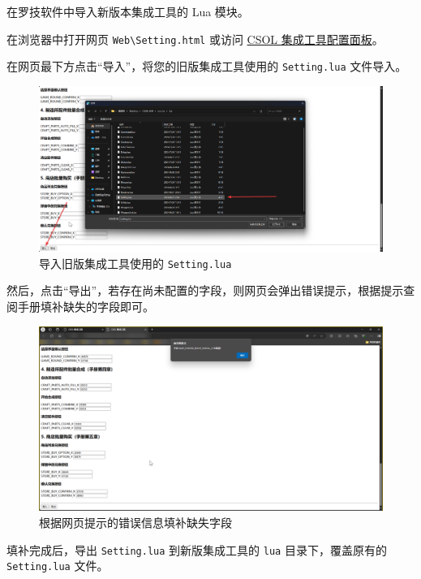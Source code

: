 在罗技软件中导入新版本集成工具的 Lua 模块。

在浏览器中打开网页 \lstinline{Web\Setting.html} 或访问 \href{https://macrohard.fun/CSOL-Utilities/Setting.html}{CSOL 集成工具配置面板}。

在网页最下方点击“导入”，将您的旧版集成工具使用的 \lstinline{Setting.lua} 文件导入。

\begin{figure}[H]
    \Centering
    \includegraphics[width=\textwidth]{docs/assets/update/import_setting}
    \caption{导入旧版集成工具使用的 \lstinline{Setting.lua}}
\end{figure}

然后，点击“导出”，若存在尚未配置的字段，则网页会弹出错误提示，根据提示查阅手册填补缺失的字段即可。

\begin{figure}[H]
    \Centering
    \includegraphics[width=\textwidth]{docs/assets/update/export_error}
    \caption{根据网页提示的错误信息填补缺失字段}
\end{figure}

填补完成后，导出 \lstinline{Setting.lua} 到新版集成工具的 \lstinline{lua} 目录下，覆盖原有的 \lstinline{Setting.lua} 文件。

